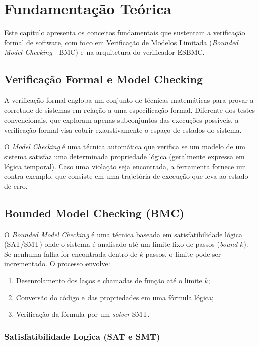 \chapter{Fundamentação Teórica}
\label{cap:fundamentacao}

Este capítulo apresenta os conceitos fundamentais que sustentam a verificação formal de software, com foco em Verificação de Modelos Limitada (\textit{Bounded Model Checking} - BMC) e na arquitetura do verificador ESBMC.

\section{Verificação Formal e Model Checking}

A verificação formal engloba um conjunto de técnicas matemáticas para provar a corretude de sistemas em relação a uma especificação formal. Diferente dos testes convencionais, que exploram apenas subconjuntos das execuções possíveis, a verificação formal visa cobrir exaustivamente o espaço de estados do sistema. 

O \textit{Model Checking} é uma técnica automática que verifica se um modelo de um sistema satisfaz uma determinada propriedade lógica (geralmente expressa em lógica temporal). Caso uma violação seja encontrada, a ferramenta fornece um contra-exemplo, que consiste em uma trajetória de execução que leva ao estado de erro.

\section{Bounded Model Checking (BMC)}

O \textit{Bounded Model Checking} é uma técnica baseada em satisfatibilidade lógica (SAT/SMT) onde o sistema é analisado até um limite fixo de passos (\textit{bound} $k$). Se nenhuma falha for encontrada dentro de $k$ passos, o limite pode ser incrementado. O processo envolve:
\begin{enumerate}
    \item Desenrolamento dos laços e chamadas de função até o limite $k$;
    \item Conversão do código e das propriedades em uma fórmula lógica;
    \item Verificação da fórmula por um \textit{solver} SMT.
\end{enumerate}

\subsection{Satisfatibilidade Logica (SAT e SMT)}

